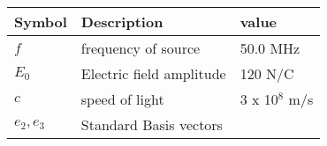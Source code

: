 \setlength{\arrayrulewidth}{0.3mm}
\setlength{\tabcolsep}{15pt}
\renewcommand{\arraystretch}{1.5}

\begin{center}
\begin{tabular}{ |p{1cm}|p{2.5cm}|p{1.7cm}|  }

\hline
Symbol& Description&value\\
\hline
$f$ & frequency of source & 50.0 MHz\\
\hline
$E_0$ & Electric field amplitude  & 120 N/C\\
\hline
$c$ &speed of light & 3 x 10$^8$ m/s \\
\hline
$e_2, e_3$ & Standard Basis vectors &  \\
\hline

\end{tabular}
\end{center}